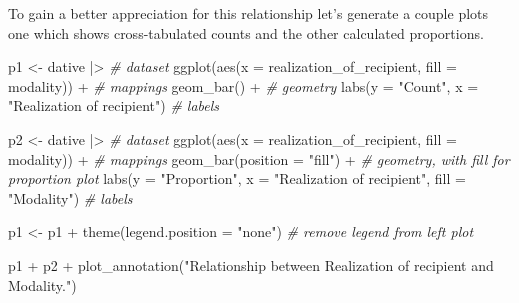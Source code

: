 \documentclass[
  letterpaper,
]{scrbook}
\newenvironment{Shaded}{\begin{snugshade}}{\end{snugshade}}
\newcommand{\AttributeTok}[1]{\textcolor[rgb]{0.00,0.00,0.00}{#1}}
\newcommand{\CommentTok}[1]{\textcolor[rgb]{0.00,0.00,0.00}{\textit{#1}}}
\newcommand{\FunctionTok}[1]{\textcolor[rgb]{0.00,0.00,0.00}{#1}}
\newcommand{\NormalTok}[1]{\textcolor[rgb]{0.00,0.00,0.00}{#1}}
\newcommand{\OtherTok}[1]{\textcolor[rgb]{0.00,0.00,0.00}{#1}}
\newcommand{\SpecialCharTok}[1]{\textcolor[rgb]{0.00,0.00,0.00}{#1}}
\newcommand{\StringTok}[1]{\textcolor[rgb]{0.00,0.00,0.00}{#1}}
\begin{document}
To gain a better appreciation for this relationship let's generate a
couple plots one which shows cross-tabulated counts and the other
calculated proportions.

\begin{Shaded}
\begin{Highlighting}[]
\NormalTok{p1 }\OtherTok{\textless{}{-}} 
\NormalTok{  dative }\SpecialCharTok{|\textgreater{}} \CommentTok{\# dataset}
  \FunctionTok{ggplot}\NormalTok{(}\FunctionTok{aes}\NormalTok{(}\AttributeTok{x =}\NormalTok{ realization\_of\_recipient, }\AttributeTok{fill =}\NormalTok{ modality)) }\SpecialCharTok{+} \CommentTok{\# mappings}
  \FunctionTok{geom\_bar}\NormalTok{() }\SpecialCharTok{+} \CommentTok{\# geometry}
  \FunctionTok{labs}\NormalTok{(}\AttributeTok{y =} \StringTok{"Count"}\NormalTok{, }\AttributeTok{x =} \StringTok{"Realization of recipient"}\NormalTok{) }\CommentTok{\# labels}

\NormalTok{p2 }\OtherTok{\textless{}{-}} 
\NormalTok{  dative }\SpecialCharTok{|\textgreater{}} \CommentTok{\# dataset}
  \FunctionTok{ggplot}\NormalTok{(}\FunctionTok{aes}\NormalTok{(}\AttributeTok{x =}\NormalTok{ realization\_of\_recipient, }\AttributeTok{fill =}\NormalTok{ modality)) }\SpecialCharTok{+} \CommentTok{\# mappings}
  \FunctionTok{geom\_bar}\NormalTok{(}\AttributeTok{position =} \StringTok{"fill"}\NormalTok{) }\SpecialCharTok{+} \CommentTok{\# geometry, with fill for proportion plot}
  \FunctionTok{labs}\NormalTok{(}\AttributeTok{y =} \StringTok{"Proportion"}\NormalTok{, }\AttributeTok{x =} \StringTok{"Realization of recipient"}\NormalTok{, }\AttributeTok{fill =} \StringTok{"Modality"}\NormalTok{) }\CommentTok{\# labels}

\NormalTok{p1 }\OtherTok{\textless{}{-}}\NormalTok{ p1 }\SpecialCharTok{+} \FunctionTok{theme}\NormalTok{(}\AttributeTok{legend.position =} \StringTok{"none"}\NormalTok{) }\CommentTok{\# remove legend from left plot}

\NormalTok{p1 }\SpecialCharTok{+}\NormalTok{ p2 }\SpecialCharTok{+} \FunctionTok{plot\_annotation}\NormalTok{(}\StringTok{"Relationship between Realization of recipient and Modality."}\NormalTok{)}
\end{Highlighting}
\end{Shaded}
\end{document}
